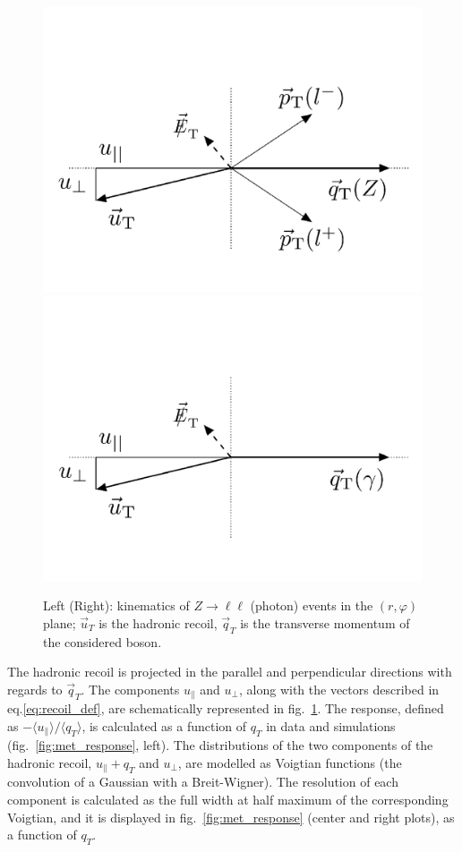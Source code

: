 \begin{figure}[!htb]
  \centering
    \includegraphics[width=.35\textwidth]{figures/MetPlots/u_comp_Z.png}%
    \includegraphics[width=.35\textwidth]{figures/MetPlots/u_comp_gamma.png}

  \caption{Left (Right): kinematics of $Z \rightarrow \ell \ell$ (photon) events in the $(r, \varphi)$ plane; $\vec{u}_T$ is the hadronic recoil, $\vec{q}_T$ is the transverse momentum of the considered boson.~\cite{CMS:2016ljj}}
  \label{fig:recoil}
\end{figure}


\noindent The hadronic recoil is projected in the parallel and perpendicular directions with regards to $\vec{q}_T$. The components $u_{\parallel}$ and $u_{\bot}$, along with the vectors described in eq.\ref{eq:recoil_def}, are schematically represented in fig.~\ref{fig:recoil}. The \MET response, defined as $- \langle u_{\parallel} \rangle / \langle q_T \rangle$, is calculated as a function of $q_T$ in data and simulations (fig.~\ref{fig:met_response}, left). The distributions of the two components of the hadronic recoil, $u_{\parallel} + q_T$ and $u_{\bot}$, are modelled as Voigtian functions (the convolution of a Gaussian with a Breit-Wigner). %
 The resolution of each component is calculated as the full width at half maximum of the corresponding Voigtian, and it is displayed in fig.~\ref{fig:met_response} (center and right plots), as a function of $q_T$.

